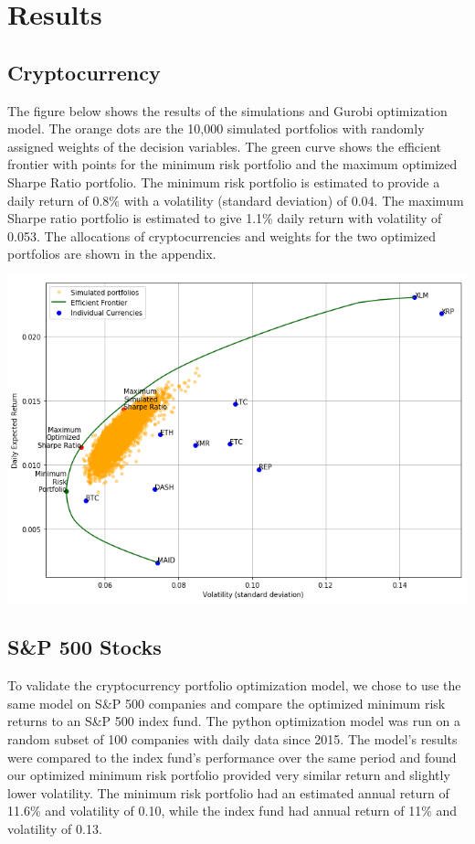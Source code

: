 \documentclass[11pt]{article} %
\begin{document}
\section{Results}

\subsection{Cryptocurrency}

The figure below shows the results of the simulations and Gurobi optimization model. The orange dots are the 10,000 simulated portfolios with randomly assigned weights of the decision variables. The green curve shows the efficient frontier with points for the minimum risk portfolio and the maximum optimized Sharpe Ratio portfolio. The minimum risk portfolio is estimated to provide a daily return of 0.8\% with a volatility (standard deviation) of 0.04. The maximum Sharpe ratio portfolio is estimated to give 1.1\% daily return with volatility of 0.053. The allocations of cryptocurrencies and weights for the two optimized portfolios are shown in the appendix.

\includegraphics[width=\textwidth]{crypt1}

\subsection{S\&P 500 Stocks}

To validate the cryptocurrency portfolio optimization model, we chose to use the same model on S\&P 500 companies and compare the optimized minimum risk returns to an S\&P 500 index fund. The python optimization model was run on a random subset of 100 companies with daily data since 2015. The model’s results were compared to the index fund's performance over the same period and found our optimized minimum risk portfolio provided very similar return and slightly lower volatility. The minimum risk portfolio had an estimated annual return of 11.6\% and volatility of 0.10, while the index fund had annual return of 11\% and volatility of 0.13. 
\end{document}
